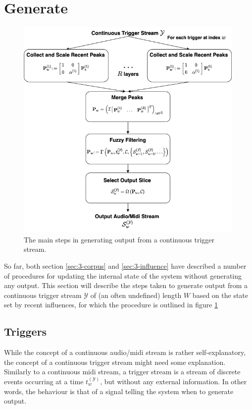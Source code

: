 \section{Generate}\label{sec:3-generate}
 \begin{figure}[h!]
    \centering        
 	\includegraphics[width=0.99\textwidth]{figures/3-somax-generate.png}
    \caption{The main steps in generating output from a continuous trigger stream.}
    \label{fig:3-somax-generate}
\end{figure}

So far, both section \ref{sec:3-corpus} and \ref{sec:3-influence} have described a number of procedures for updating the internal state of the system without generating any output. This section will describe the steps taken to generate output from a continuous trigger stream $\mathcal Y$ of (an often undefined) length $W$ based on the state set by recent influences, for which the procedure is outlined in figure \ref{fig:3-somax-generate}

\subsection{Triggers}\label{sec:3-generate-triggers}
While the concept of a continuous audio/midi stream is rather self-explanatory, the concept of a continuous trigger stream might need some explanation. Similarly to a continuous midi stream, a trigger stream is a stream of discrete events occurring at a time $t^{(\mathcal Y)}_w$, but without any external information. In other words, the behaviour is that of a signal telling the system when to generate output.

